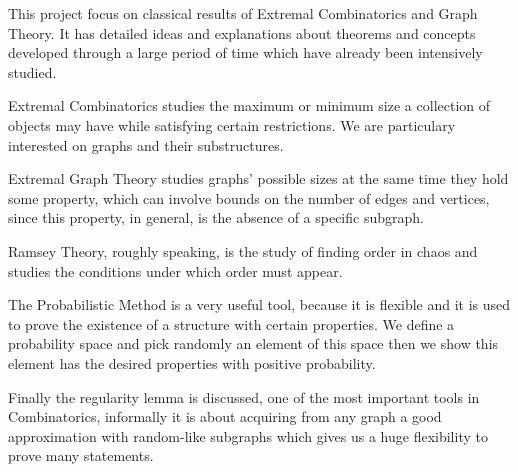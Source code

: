 \documentclass[12pt,twoside,a4paper,bibliography=totocnumbered]{book}
\numberwithin{equation}{section}
\theoremstyle{remark}
\begin{document}
This project focus on classical results of Extremal Combinatorics and Graph Theory. It has detailed ideas and explanations about theorems and concepts developed through a large period of time which have already been intensively studied.

Extremal Combinatorics studies the maximum or minimum size a collection of objects may have while satisfying certain restrictions. We are particulary interested on graphs and their substructures. 

Extremal Graph Theory studies graphs' possible sizes at the same time they hold some property, which can involve bounds on the number of edges and vertices, since this property, in general, is the absence of a specific subgraph.

Ramsey Theory, roughly speaking, is the study of finding order in chaos and studies the conditions under which order must appear.

The Probabilistic Method is a very useful tool, because it is flexible and it is used to prove the existence of a structure with certain properties. We define a probability space and pick randomly an element of this space then we show this element has the desired properties with positive probability.

Finally the regularity lemma is discussed, one of the most important tools in Combinatorics, informally it is about acquiring from any graph a good approximation with random-like subgraphs which gives us a huge flexibility to prove many statements.






\end{document}
